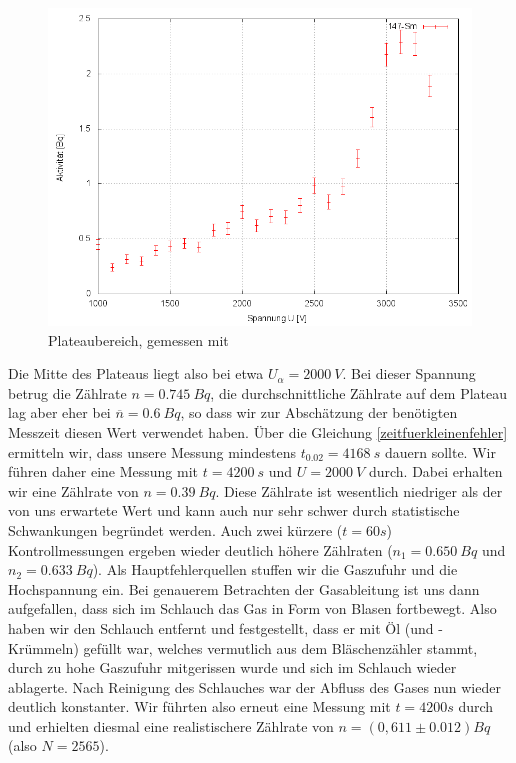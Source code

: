 \begin{figure}[H]
 \centering \includegraphics[width=0.9\linewidth]{Messwerte/plots/Sm147_plateau.png}
 \caption{Plateaubereich, gemessen mit }
\end{figure}

Die Mitte des Plateaus liegt also bei etwa $U_{\alpha} = 2000\ V$. Bei dieser Spannung betrug die Zählrate $n = 0.745\ Bq$, die durchschnittliche Zählrate auf dem Plateau lag aber eher bei $\overline{n} = 0.6\ Bq$, so dass wir zur Abschätzung der benötigten Messzeit diesen Wert verwendet haben. Über die Gleichung \ref{zeitfuerkleinenfehler} ermitteln wir, dass unsere Messung mindestens $t_{0.02} = 4168\ s$ dauern sollte. Wir führen daher eine Messung mit $t = 4200\ s$ und $ U = 2000\ V$ durch. Dabei erhalten wir eine Zählrate von $n = 0.39\ Bq$. Diese Zählrate ist wesentlich niedriger als der von uns erwartete Wert und kann auch nur sehr schwer durch statistische Schwankungen begründet werden. Auch zwei kürzere ($t = 60s$) Kontrollmessungen ergeben wieder deutlich höhere Zählraten ($n_1 = 0.650\ Bq$ und $n_2 = 0.633\ Bq$). Als Hauptfehlerquellen stuffen wir die Gaszufuhr und die Hochspannung ein. Bei genauerem Betrachten der Gasableitung ist uns dann aufgefallen, dass sich im Schlauch das Gas in Form von Blasen fortbewegt. Also haben wir den Schlauch entfernt und festgestellt, dass er mit Öl (und -Krümmeln) gefüllt war, welches vermutlich aus dem Bläschenzähler stammt, durch zu hohe Gaszufuhr mitgerissen wurde und sich im Schlauch wieder ablagerte. Nach Reinigung des Schlauches war der Abfluss des Gases nun wieder deutlich konstanter. Wir führten also erneut eine Messung mit $t=4200s$ durch und erhielten diesmal eine realistischere Zählrate von $n = (0,611 \pm 0.012) Bq$ (also $N = 2565$). 

